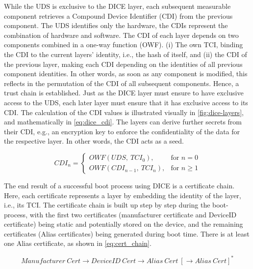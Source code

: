 



While the UDS is exclusive to the DICE layer, each subsequent measurable component retrieves a Compound Device Identifier (CDI) from the previous component. The UDS identifies only the hardware, the CDIs represent the combination of hardware and software. The CDI of each layer depends on two components combined in a one-way function (OWF). (i) The own TCI, binding the CDI to the current layers' identity, i.e., the hash of itself, and (ii) the CDI of the previous layer, making each CDI depending on the identities of all previous component identities. In other words, as soon as any component is modified, this reflects in the permutation of the CDI of all subsequent components. Hence, a trust chain is established. Just as the DICE layer must ensure to have exclusive access to the UDS, each later layer must ensure that it has exclusive access to its CDI. The calculation of the CDI values is illustrated visually in \autoref{fig:dice-layers}, and mathematically in \autoref{eq:dice_cdi}. The layers can derive further secrets from their CDI, e.g., an encryption key to enforce the confidentiality of the data for the respective layer. In other words, the CDI acts as a seed.

\begin{equation}
  \label{eq:dice_cdi}
  CDI_n =
  \begin{cases}
    OWF(UDS,\ TCI_0), & \text{for } n=0\\
    OWF(CDI_{n-1},\ TCI_n), & \text{for } n \geq 1
  \end{cases}
\end{equation}


The end result of a successful boot process using DICE is a certificate chain.
Here, each certificate represents a layer by embedding the identity of the layer, i.e., its TCI.
The certificate chain is built up step by step during the boot-process, with
the first two certificates (manufacturer certificate and DeviceID certificate) being static and potentially stored on the device, and the remaining certificates (Alias certificates) being generated during boot time. There is at least one Alias certificate, as shown in \autoref{eq:cert_chain}.

\begin{equation}
  \label{eq:cert_chain}
  Manufacturer\ Cert \rightarrow DeviceID\ Cert \rightarrow Alias\ Cert\ [\rightarrow Alias\ Cert]^*
\end{equation}

